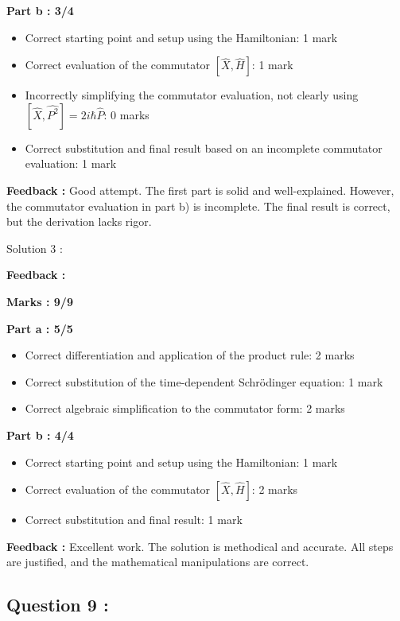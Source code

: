 \documentclass[a4paper,11pt]{article}
\begin{document}
\textbf{Part b : 3/4}

\begin{itemize}
    \item Correct starting point and setup using the Hamiltonian: 1 mark
    \item Correct evaluation of the commutator $[\hat{X}, \hat{H}]$: 1 mark
    \item Incorrectly simplifying the commutator evaluation, not clearly using $[\hat{X}, \hat{P^2}] = 2i \hbar \hat{P}$: 0 marks
    \item Correct substitution and final result based on an incomplete commutator evaluation: 1 mark
\end{itemize}

\textbf{Feedback :}
Good attempt. The first part is solid and well-explained. However, the commutator evaluation in part b) is incomplete. The final result is correct, but the derivation lacks rigor.



Solution 3 :

\textbf{Feedback :}

\textbf{Marks : 9/9}

\textbf{Part a : 5/5}

\begin{itemize}
    \item Correct differentiation and application of the product rule: 2 marks
    \item Correct substitution of the time-dependent Schrödinger equation: 1 mark
    \item Correct algebraic simplification to the commutator form: 2 marks
\end{itemize}


\textbf{Part b : 4/4}

\begin{itemize}
    \item Correct starting point and setup using the Hamiltonian: 1 mark
    \item Correct evaluation of the commutator $[\hat{X}, \hat{H}]$: 2 marks
    \item Correct substitution and final result: 1 mark
\end{itemize}

\textbf{Feedback :}
Excellent work. The solution is methodical and accurate. All steps are justified, and the mathematical manipulations are correct.


\subsection*{Question 9 :}
\end{document}
